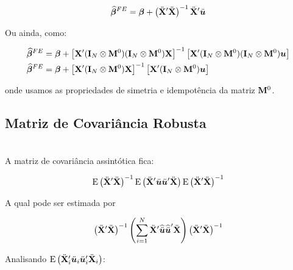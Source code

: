 \documentclass[11pt, oneside, a4paper, article]{article}
\numberwithin{equation}{section}
\begin{document}
\vspace{-1 em}
\begin{align} \label{fe:betahat:3}
\widehat{\boldsymbol{\beta}}^{FE} =
\boldsymbol{\beta} +
\left( \ddot{\mathbf{X}}' \ddot{\mathbf{X}} \right)^{-1}
\ddot{\mathbf{X}}' \ddot{\boldsymbol{u}}
\end{align}

\noindent
Ou ainda, como:

\vspace{-1 em}
\begin{align}
\notag
\widehat{\boldsymbol{\beta}}^{FE} &=
\boldsymbol{\beta} +
\left[ \mathbf{X}' ( \mathbf{I}_{N} \otimes \mathbf{M}^{0} )( \mathbf{I}_{N} \otimes \mathbf{M}^{0} ) \mathbf{X} \right]^{-1}
\left[ \mathbf{X}' ( \mathbf{I}_{N} \otimes \mathbf{M}^{0} )( \mathbf{I}_{N} \otimes \mathbf{M}^{0} ) \boldsymbol{u} \right]
\\
\label{fe:betahat:4}
\widehat{\boldsymbol{\beta}}^{FE} &=
\boldsymbol{\beta} +
\left[ \mathbf{X}' ( \mathbf{I}_{N} \otimes \mathbf{M}^{0} ) \mathbf{X} \right]^{-1}
\left[ \mathbf{X}' ( \mathbf{I}_{N} \otimes \mathbf{M}^{0} ) \boldsymbol{u} \right]
\end{align}

\noindent
onde usamos as propriedades de simetria e idempotência da matriz $\mathbf{M}^{0}$.

\subsection{Matriz de Covariância Robusta}
\noindent
\citet[sec.10.5.2 -- Asymptotic Inference with Fixed Effects, p.269--272]{wool-2010} \\

A matriz de covariância assintótica fica:

\vspace{-1 em}
\begin{align*}
	\text{E}\left( \ddot{\mathbf{X}}' \ddot{\mathbf{X}} \right)^{-1}
	\text{E}\left( \ddot{\mathbf{X}}' \ddot{\boldsymbol{u}} \ddot{\boldsymbol{u}}' \ddot{\mathbf{X}} \right)
	\text{E}\left( \ddot{\mathbf{X}}' \ddot{\mathbf{X}} \right)^{-1}
\end{align*}

A qual pode ser estimada por

\vspace{-1 em}
\begin{align*}
\left( \ddot{\mathbf{X}}' \ddot{\mathbf{X}} \right)^{-1}
\left( \sum_{i=1}^{N} \ddot{\mathbf{X}}'
\widehat{\ddot{\boldsymbol{u}}} \widehat{\ddot{\boldsymbol{u}}}'
\ddot{\mathbf{X}} \right)
\left( \ddot{\mathbf{X}}' \ddot{\mathbf{X}} \right)^{-1}
\end{align*}

\noindent
Analisando
$\text{E}\left( \ddot{\mathbf{X}}_{i}' \ddot{\boldsymbol{u}}_{i} \ddot{\boldsymbol{u}}_{i}' \ddot{\mathbf{X}}_{i} \right)$:
\end{document}
